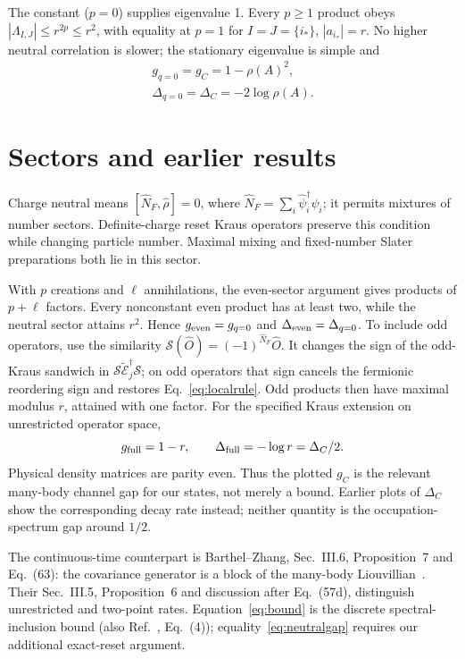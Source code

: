 \documentclass[aps,prb,twocolumn,10pt,raggedbottom,nofootinbib,superscriptaddress]{revtex4-2}
\newcommand{\E}{\widetilde{\mathcal E}}
\begin{document}
The constant ($p=0$) supplies eigenvalue 1. Every $p\ge1$ product
obeys $|\Lambda_{I,J}|\le r^{2p}\le r^2$, with equality at $p=1$ for
$I=J=\{i_*\}$, $|a_{i_*}|=r$. No higher neutral correlation is slower;
the stationary eigenvalue is simple and
\begin{align}
 \boxed{g_{q=0}=g_C=1-\rho(A)^2,} \label{eq:neutralgap}\\
 \Delta_{q=0}=\Delta_C=-2\log\rho(A). \nonumber
\end{align}

\section{Sectors and earlier results}
Charge neutral means $[\hat N_F,\hat\rho]=0$, where
$\hat N_F=\sum_i\hat\psi_i^\dagger\hat\psi_i$; it permits mixtures
of number sectors. Definite-charge reset Kraus operators preserve this
condition while changing particle number. Maximal mixing and
fixed-number Slater preparations both lie in this sector.

With $p$ creations and $\ell$ annihilations, the even-sector argument
gives products of $p+\ell$ factors. Every nonconstant even product
has at least two, while the neutral sector attains $r^2$. Hence
$g_{\rm even}=g_{q=0}$ and $\Delta_{\rm even}=\Delta_{q=0}$.
To include odd operators, use the
similarity $\mathcal S(\hat O)=(-1)^{\hat N_F}\hat O$. It changes the
sign of the odd-Kraus sandwich in
$\mathcal S\E_j^\dagger\mathcal S$; on odd operators that sign cancels
the fermionic reordering sign and restores Eq.~\eqref{eq:localrule}.
Odd products then have maximal modulus $r$, attained with one factor.
For the specified Kraus extension on unrestricted operator space,
\begin{equation}
 g_{\rm full}=1-r,\qquad \Delta_{\rm full}=-\log r=\Delta_C/2.
\end{equation}
Physical density matrices are parity even. Thus the plotted $g_C$ is
the relevant many-body channel gap for our states, not merely a bound.
Earlier plots of $\Delta_C$ show the corresponding decay rate instead;
neither quantity is the occupation-spectrum gap around $1/2$.

The continuous-time counterpart is Barthel--Zhang, Sec.~III.6,
Proposition~7 and Eq.~(63): the covariance generator is a block of the
many-body Liouvillian~\cite{BZ}. Their Sec.~III.5, Proposition~6 and
discussion after Eq.~(57d), distinguish unrestricted and two-point
rates. Equation~\eqref{eq:bound} is the discrete spectral-inclusion
bound (also Ref.~\cite{project}, Eq.~(4)); equality~\eqref{eq:neutralgap}
requires our additional exact-reset argument.
\end{document}
